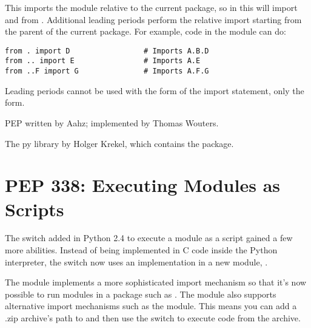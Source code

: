 \documentclass{howto}
\begin{document}
This imports the  module relative to the current
package, so in  this will import  and
 from .  Additional leading periods
perform the relative import starting from the parent of the current
package.  For example, code in the  module can do:

\begin{verbatim}
from . import D                 # Imports A.B.D
from .. import E                # Imports A.E
from ..F import G               # Imports A.F.G
\end{verbatim}

Leading periods cannot be used with the  
form of the import statement, only the  form.

\begin{seealso}

{PEP written by Aahz; implemented by Thomas Wouters.}

{The py library by Holger Krekel, which contains the  package.}

\end{seealso}


\section{PEP 338: Executing Modules as Scripts\label{pep-338}}

The  switch added in Python 2.4 to execute a module as
a script gained a few more abilities.  Instead of being implemented in
C code inside the Python interpreter, the switch now uses an
implementation in a new module, .

The  module implements a more sophisticated import
mechanism so that it's now possible to run modules in a package such
as .  The module also supports alternative
import mechanisms such as the  module.  This means
you can add a .zip archive's path to  and then use the
 switch to execute code from the archive.


\begin{seealso}


\end{seealso}
\end{document}
